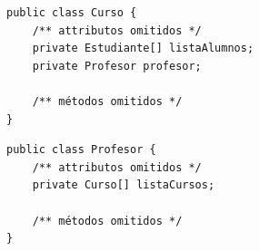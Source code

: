 

\begin{lstlisting}
public class Curso {
    /** attributos omitidos */
    private Estudiante[] listaAlumnos;
    private Profesor profesor;

    /** métodos omitidos */
}
\end{lstlisting}



\begin{lstlisting}
public class Profesor {
    /** attributos omitidos */
    private Curso[] listaCursos;

    /** métodos omitidos */
}
\end{lstlisting}
\columnsend

